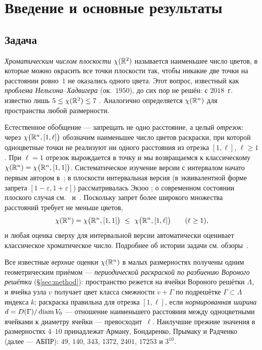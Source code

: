 \section{Введение и основные результаты}\label{sec:intro}

\subsection{Задача}

\emph{Хроматическим числом плоскости} $\chi(\mathbb{R}^2)$ называется наименьшее число
цветов, в которые можно окрасить все точки плоскости так, чтобы никакие две
точки на расстоянии ровно~$1$ не оказались одного цвета. Этот вопрос, известный
как \emph{проблема Нельсона--Хадвигера} (ок.~$1950$), до сих пор не решён: с
$2018$~г. известно лишь $5\le\chi(\mathbb{R}^2)\le7$ \cite{deGrey,Soifer}. Аналогично
определяется $\chi(\mathbb{R}^n)$ для пространства любой размерности.

Естественное обобщение --- запрещать не одно расстояние, а целый \emph{отрезок}:
через $\chi\bigl(\mathbb{R}^n,[1,\ell]\bigr)$ обозначим наименьшее число цветов
раскраски, при которой одноцветные точки не реализуют ни одного расстояния из
отрезка $[1,\ell]$, $\ell\ge1$. При $\ell=1$ отрезок вырождается в точку и мы
возвращаемся к классическому $\chi(\mathbb{R}^n)=\chi\bigl(\mathbb{R}^n,[1,1]\bigr)$.
Систематическое изучение версии с интервалом начато первым автором
в~\cite{Ivanov2011}; в плоскости интервальная версия (в эквивалентной форме
запрета $[1-\varepsilon,1+\varepsilon]$) рассматривалась Экзоо
\cite{Exoo2005}; о современном состоянии плоского случая см.~\cite{ChJW}
и~\cite{Parts2023}. Поскольку запрет более широкого множества
расстояний требует не меньше цветов,
\begin{equation}\label{eq:mono}
\chi(\R^n)=\chi\bigl(\R^n,[1,1]\bigr)\ \le\ \chi\bigl(\R^n,[1,\ell]\bigr)
\qquad(\ell\ge1),
\end{equation}
и любая оценка сверху для интервальной версии автоматически оценивает
классическое хроматическое число. Подробнее об истории задачи см.
обзоры~\cite{BogolubskyRaigorodskii,Raigorodskii2001,Raigorodskii2013,Raigorodskii2014}.

Все известные \emph{верхние} оценки $\chi(\mathbb{R}^n)$ в малых размерностях получены
одним геометрическим приёмом --- \emph{периодической раскраской по разбиению
Вороного решётки} (\S\ref{sec:method}): пространство режется на ячейки Вороного
решётки $\Lambda$, и ячейка узла $v$ получает цвет класса смежности $v+\Gamma$
по подрешётке $\Gamma\subset\Lambda$ индекса $k$; раскраска правильна для
отрезка $[1,\ell]$, если \emph{нормированная ширина}
$d=D(\Gamma)/\operatorname{diam} V_0$ --- отношение наименьшего расстояния между
одноцветными ячейками к диаметру ячейки --- превосходит~$\ell$. Наилучшие
прежние значения в размерностях $4$--$10$ принадлежат Арману, Бондаренко,
Прымаку и Радченко~\cite{ABPR} (далее --- АБПР): $49$, $140$, $343$, $1372$,
$2401$, $17253$ и $3^{10}$.

